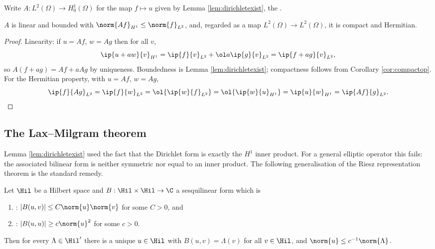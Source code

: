 \begin{definition}
	Write $A : L^2(\Omega)\to H_0^1(\Omega)$ for the map $f \mapsto u$ given by Lemma \ref{lem:dirichletexist}, the .
\end{definition}

\begin{proposition}\label{prop:solop}
	$A$ is linear and bounded with $\norm{Af}_{H^1}\le\norm{f}_{L^2}$, and, regarded as a map $L^2(\Omega)\to L^2(\Omega)$, it is compact and Hermitian.
\end{proposition}

\begin{proof}
	Linearity: if $u = Af$, $w=Ag$ then for all $v$,
	$$\ip{u+aw}{v}_{H^1}=\ip{f}{v}_{L^2}+\ol a\ip{g}{v}_{L^2}=\ip{f+ag}{v}_{L^2},$$
	so $A(f+ag)=Af+aAg$ by uniqueness. Boundedness is Lemma \ref{lem:dirichletexist}; compactness follows from Corollary \ref{cor:compactop}. For the Hermitian property, with $u = Af$, $w = Ag$,
	$$\ip{f}{Ag}_{L^2}=\ip{f}{w}_{L^2}=\ol{\ip{w}{f}_{L^2}}=\ol{\ip{w}{u}_{H^1}}=\ip{u}{w}_{H^1}=\ip{Af}{g}_{L^2}. \qedhere$$
\end{proof}

\subsection{The Lax--Milgram theorem}

Lemma \ref{lem:dirichletexist} used the fact that the Dirichlet form is exactly the $H^1$ inner product. For a general elliptic operator this fails: the associated bilinear form is neither symmetric nor equal to an inner product. The following generalisation of the Riesz representation theorem is the standard remedy.

\begin{theorem}\label{thm:laxmilgram}
	Let $\Hil$ be a Hilbert space and $B : \Hil\times\Hil\to\C$ a sesquilinear form which is
	\begin{enumerate}[label=(\roman*)]
		\item {}: $|B(u,v)|\le C\norm{u}\norm{v}$ for some $C>0$, and
		\item {}: $|B(u,u)|\ge c\norm{u}^2$ for some $c>0$.
	\end{enumerate}
	Then for every $\Lambda \in \Hil'$ there is a unique $u \in \Hil$ with $B(u,v)=\Lambda(v)$ for all $v\in\Hil$, and $\norm{u}\le c^{-1}\norm{\Lambda}$.
\end{theorem}

